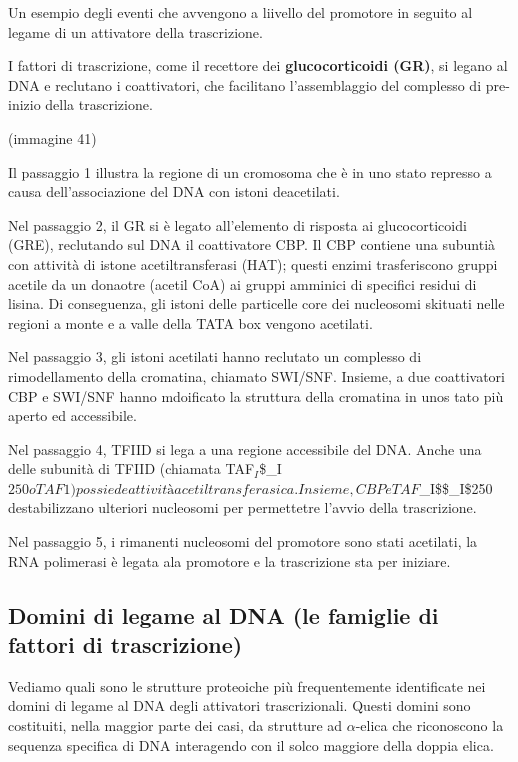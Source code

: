 \documentclass[11pt]{book}
\begin{document}
Un esempio degli eventi che avvengono a liivello del promotore in
seguito al legame di un attivatore della trascrizione.

I fattori di trascrizione, come il recettore dei \textbf{glucocorticoidi
(GR)}, si legano al DNA e reclutano i coattivatori, che facilitano
l'assemblaggio del complesso di pre-inizio della trascrizione.

(immagine 41)

Il passaggio 1 illustra la regione di un cromosoma che è in uno stato
represso a causa dell'associazione del DNA con istoni deacetilati.

Nel passaggio 2, il GR si è legato all'elemento di risposta ai
glucocorticoidi (GRE), reclutando sul DNA il coattivatore CBP. Il CBP
contiene una subuntià con attività di istone acetiltransferasi (HAT);
questi enzimi trasferiscono gruppi acetile da un donaotre (acetil CoA)
ai gruppi amminici di specifici residui di lisina. Di conseguenza, gli
istoni delle particelle core dei nucleosomi skituati nelle regioni a
monte e a valle della TATA box vengono acetilati.

Nel passaggio 3, gli istoni acetilati hanno reclutato un complesso di
rimodellamento della cromatina, chiamato SWI/SNF. Insieme, a due
coattivatori CBP e SWI/SNF hanno mdoificato la struttura della cromatina
in unos tato più aperto ed accessibile.

Nel passaggio 4, TFIID si lega a una regione accessibile del DNA. Anche
una delle subunità di TFIID (chiamata
TAF\(_I\)\$\_I\(250 o TAF1) possiede attività acetiltransferasica. Insieme, CBP e TAF\)\_I\$\$\_I\$250
destabilizzano ulteriori nucleosomi per permettetre l'avvio della
trascrizione.

Nel passaggio 5, i rimanenti nucleosomi del promotore sono stati
acetilati, la RNA polimerasi è legata ala promotore e la trascrizione
sta per iniziare.

\subsection{Domini di legame al DNA (le famiglie di fattori di
trascrizione)}\label{domini-di-legame-al-dna-le-famiglie-di-fattori-di-trascrizione}

Vediamo quali sono le strutture proteoiche più frequentemente
identificate nei domini di legame al DNA degli attivatori
trascrizionali. Questi domini sono costituiti, nella maggior parte dei
casi, da strutture ad \(\alpha\)-elica che riconoscono la sequenza
specifica di DNA interagendo con il solco maggiore della doppia elica.
\end{document}
